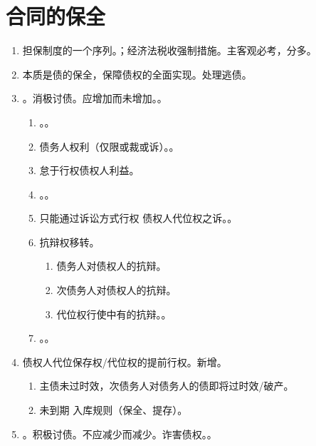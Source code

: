 \section{合同的保全}
\begin{enumerate}
  \item 担保制度的一个序列。；经济法税收强制措施。主客观必考，分多。
  \item 本质是债的保全，保障债权的全面实现。处理逃债。
  \item {}。消极讨债。应增加而未增加。。
        \begin{enumerate}
          \item {}。。
          \item 债务人权利（仅限或裁或诉）。。
          \item 怠于行权债权人利益。
          \item {}。。
          \item 只能通过诉讼方式行权 \yjt 债权人代位权之诉。。
          \item 抗辩权移转。
                \begin{enumerate}
                  \item 债务人对债权人的抗辩。
                  \item 次债务人对债权人的抗辩。
                  \item 代位权行使中有的抗辩。。
                \end{enumerate}
          \item {}。。
        \end{enumerate}
  \item 债权人代位保存权/代位权的提前行权。新增。
        \begin{enumerate}
          \item 主债未过时效，次债务人对债务人的债即将过时效/破产。
          \item 未到期 \yjt 入库规则（保全、提存）。
        \end{enumerate}
  \item {}。积极讨债。不应减少而减少。诈害债权。。

\end{enumerate}
